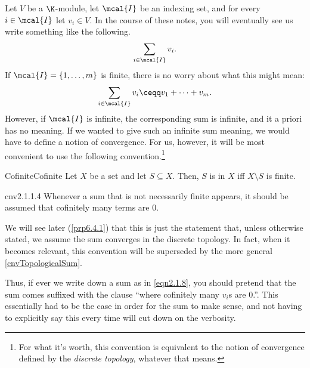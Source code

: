 Let $V$ be a $\K$-module, let $\mcal{I}$ be an indexing set, and for every $i\in \mcal{I}$ let $v_i\in V$.  In the course of these notes, you will eventually see us write something like the following.
\begin{equation}\label{eqn2.1.8}
\sum _{i\in \mcal{I}}v_i.
\end{equation}
If $\mcal{I}=\{ 1,\ldots ,m\}$ is finite, there is no worry about what this might mean:
\begin{equation}
\sum _{i\in \mcal{I}}v_i\ceqq v_1+\cdots +v_m.
\end{equation}
However, if $\mcal{I}$ is infinite, the corresponding sum is infinite, and it a priori has no meaning.  If we wanted to give such an infinite sum meaning, we would have to define a notion of convergence.  For us, however, it will be most convenient to use the following convention.\footnote{For what it's worth, this convention is equivalent to the notion of convergence defined by the \emph{discrete topology}, whatever that means.}
\begin{dfn}{Cofinite}{Cofinite}
	Let $X$ be a set and let $S\subseteq X$.  Then, $S$ is  in $X$ iff $X\setminus S$ is finite.
\end{dfn}
\begin{cnv}{}{cnv2.1.1.4}
	Whenever a sum that is not necessarily finite appears, it should be assumed that cofinitely many terms are $0$.
	\begin{rmk}
		We will see later (\cref{prp6.4.1}) that this is just the statement that, unless otherwise stated, we assume the sum converges in the discrete topology.  In fact, when it becomes relevant, this convention will be superseded by the more general \cref{cnvTopologicalSum}.
	\end{rmk}
\end{cnv}
Thus, if ever we write down a sum as in \eqref{eqn2.1.8}, you should pretend that the sum comes suffixed with the clause ``\textellipsis where cofinitely many $v_i$s are $0$.''.  This essentially had to be the case in order for the sum to make sense, and not having to explicitly say this every time will cut down on the verbosity.

